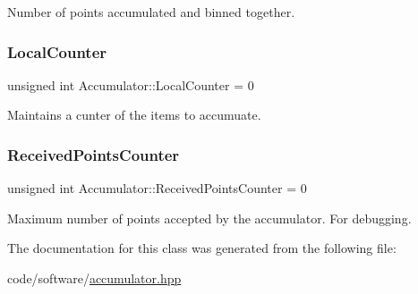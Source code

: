 Number of points accumulated and binned together. 

\mbox{\label{classAccumulator_a753e3878c3078a11ee9bc13b6185ec60}} 
\subsubsection{\texorpdfstring{Local\+Counter}{LocalCounter}}
{\footnotesize\ttfamily unsigned int Accumulator\+::\+Local\+Counter = 0\hspace{0.3cm}{\ttfamily [private]}}



Maintains a cunter of the items to accumuate. 

\mbox{\label{classAccumulator_a9cc7c392e99778c99593f7798cb2ab3b}} 
\subsubsection{\texorpdfstring{Received\+Points\+Counter}{ReceivedPointsCounter}}
{\footnotesize\ttfamily unsigned int Accumulator\+::\+Received\+Points\+Counter = 0\hspace{0.3cm}{\ttfamily [private]}}



Maximum number of points accepted by the accumulator. For debugging. 



The documentation for this class was generated from the following file\+:\begin{DoxyCompactItemize}
\item 
code/software/\hyperlink{accumulator_8hpp}{accumulator.\+hpp}\end{DoxyCompactItemize}

